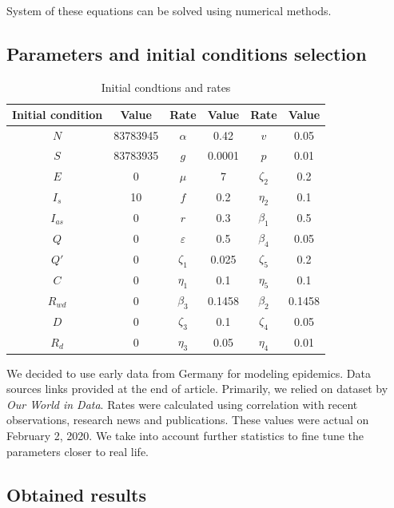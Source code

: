 \documentclass[12pt, a4paper]{article}
\begin{document}
	System of these equations can be solved using numerical methods.

	\newpage

	\subsection{Parameters and initial conditions selection}

	\begin{longtable}[c]{| c | c | c | c | c | c |}
		\caption{Initial condtions and rates}\\
		\hline
		Initial condition & Value & Rate & Value & Rate & Value\\
		\hline
		$N$ & 83783945 & $\alpha$ & 0.42 & $v$ & 0.05 \\
		$S$ & 83783935 & $g$ & 0.0001 & $p$ & 0.01\\
		$E$ & 0 & $\mu$ & 7 & $\zeta_2$ & 0.2\\
		$I_s$ & 10 & $f$ & 0.2 & $\eta_2$ & 0.1 \\
		$I_{as}$ & 0 & $r$ & 0.3 & $\beta_1$ & 0.5\\
		$Q$ & 0 &$\varepsilon$ & 0.5 & $\beta_4$ & 0.05\\
		$Q'$ & 0 &$\zeta_1$ & 0.025 & $\zeta_5$ & 0.2 \\
		$C$ & 0 &$\eta_1$ & 0.1 & $\eta_5$ & 0.1\\
		$R_{wd}$ & 0 & $\beta_3$ & 0.1458 & $\beta_2$ & 0.1458\\
		$D$ & 0 & $\zeta_3$ & 0.1 & $\zeta_4$ & 0.05\\
		$R_d$ & 0 & $\eta_3$ & 0.05 & $\eta_4$ & 0.01\\
		\hline

	\end{longtable}

	We decided to use early data from Germany for modeling epidemics. Data sources links provided at the end of article. Primarily, we relied on dataset by \textit{Our World in Data}. Rates were calculated using correlation with recent observations, research news and publications. These values were actual on February 2, 2020. We take into account further statistics to fine tune the parameters closer to real life.

	\subsection{Obtained results}
\end{document}
